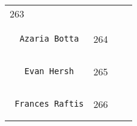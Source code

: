 \documentclass[]{article}
\begin{document}
\begin{longtable}[c]{@{}llll@{}}
\begin{minipage}[t]{0.10\columnwidth}
263
\end{minipage} & \begin{minipage}[t]{0.13\columnwidth}\raggedright
\end{minipage} & \begin{minipage}[t]{0.15\columnwidth}\raggedright
\end{minipage}
\\\noalign{\medskip}
\begin{minipage}[t]{0.39\columnwidth}\raggedright
\begin{verbatim}
  Azaria Botta
\end{verbatim}
\end{minipage} & \begin{minipage}[t]{0.10\columnwidth}\raggedright
264
\end{minipage} & \begin{minipage}[t]{0.13\columnwidth}\raggedright
\end{minipage} & \begin{minipage}[t]{0.15\columnwidth}\raggedright
\end{minipage}
\\\noalign{\medskip}
\begin{minipage}[t]{0.39\columnwidth}\raggedright
\begin{verbatim}
   Evan Hersh
\end{verbatim}
\end{minipage} & \begin{minipage}[t]{0.10\columnwidth}\raggedright
265
\end{minipage} & \begin{minipage}[t]{0.13\columnwidth}\raggedright
\end{minipage} & \begin{minipage}[t]{0.15\columnwidth}\raggedright
\end{minipage}
\\\noalign{\medskip}
\begin{minipage}[t]{0.39\columnwidth}\raggedright
\begin{verbatim}
 Frances Raftis
\end{verbatim}
\end{minipage} & \begin{minipage}[t]{0.10\columnwidth}\raggedright
266
\end{minipage} & \begin{minipage}[t]{0.13\columnwidth}\raggedright
\end{minipage} & \begin{minipage}[t]{0.15\columnwidth}\raggedright

\end{minipage}
\end{longtable}
\end{document}
